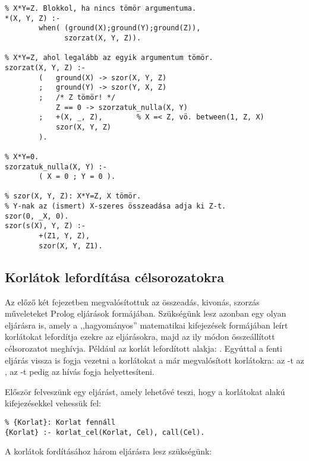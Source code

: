 \begin{verbatim}
% X*Y=Z. Blokkol, ha nincs tömör argumentuma.
*(X, Y, Z) :-
        when( (ground(X);ground(Y);ground(Z)),
              szorzat(X, Y, Z)).

% X*Y=Z, ahol legalább az egyik argumentum tömör.
szorzat(X, Y, Z) :-
        (   ground(X) -> szor(X, Y, Z)
        ;   ground(Y) -> szor(Y, X, Z)
        ;   /* Z tömör! */
            Z == 0 -> szorzatuk_nulla(X, Y)
        ;   +(X, _, Z),        % X =< Z, vö. between(1, Z, X)
            szor(X, Y, Z)
        ).

% X*Y=0.
szorzatuk_nulla(X, Y) :-
        ( X = 0 ; Y = 0 ).

% szor(X, Y, Z): X*Y=Z, X tömör.
% Y-nak az (ismert) X-szeres összeadása adja ki Z-t.
szor(0, _X, 0).
szor(s(X), Y, Z) :-
        +(Z1, Y, Z),
        szor(X, Y, Z1).
\end{verbatim}

\subsection{Korlátok lefordítása célsorozatokra}

Az előző két fejezetben megvalósítottuk az összeadás, kivonás, szorzás
műveleteket Prolog eljárások formájában. Szükségünk lesz azonban egy
olyan eljárásra is, amely a ,,hagyományos'' matematikai kifejezések
formájában leírt korlátokat lefordítja ezekre az eljárásokra, majd az ily
módon összeállított célsorozatot meghívja. Például az  korlát
lefordított alakja: . Egyúttal a fenti eljárás
vissza is fogja vezetni a \cd{=<, <, >=, >} korlátokat a már megvalósított
korlátokra: az -t az , az -t pedig az
 hívás fogja helyettesíteni.

Először felveszünk egy eljárást, amely lehetővé teszi, hogy a korlátokat
 alakú kifejezésekkel vehessük fel:

\begin{verbatim}
% {Korlat}: Korlat fennáll
{Korlat} :- korlat_cel(Korlat, Cel), call(Cel).
\end{verbatim}

A korlátok fordításához három eljárásra lesz szükségünk:

